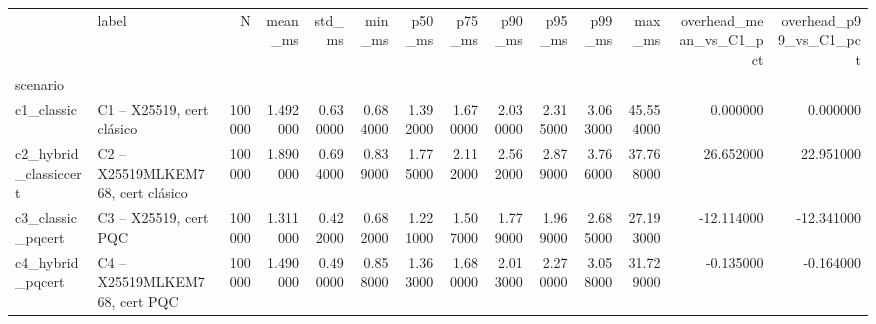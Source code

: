 \begin{tabular}{llrrrrrrrrrrrr}
\toprule
 & label & N & mean_ms & std_ms & min_ms & p50_ms & p75_ms & p90_ms & p95_ms & p99_ms & max_ms & overhead_mean_vs_C1_pct & overhead_p99_vs_C1_pct \\
scenario &  &  &  &  &  &  &  &  &  &  &  &  &  \\
\midrule
c1_classic & C1 – X25519, cert clásico & 100000 & 1.492000 & 0.630000 & 0.684000 & 1.392000 & 1.670000 & 2.030000 & 2.315000 & 3.063000 & 45.554000 & 0.000000 & 0.000000 \\
c2_hybrid_classiccert & C2 – X25519MLKEM768, cert clásico & 100000 & 1.890000 & 0.694000 & 0.839000 & 1.775000 & 2.112000 & 2.562000 & 2.879000 & 3.766000 & 37.768000 & 26.652000 & 22.951000 \\
c3_classic_pqcert & C3 – X25519, cert PQC & 100000 & 1.311000 & 0.422000 & 0.682000 & 1.221000 & 1.507000 & 1.779000 & 1.969000 & 2.685000 & 27.193000 & -12.114000 & -12.341000 \\
c4_hybrid_pqcert & C4 – X25519MLKEM768, cert PQC & 100000 & 1.490000 & 0.490000 & 0.858000 & 1.363000 & 1.680000 & 2.013000 & 2.270000 & 3.058000 & 31.729000 & -0.135000 & -0.164000 \\
\bottomrule
\end{tabular}
